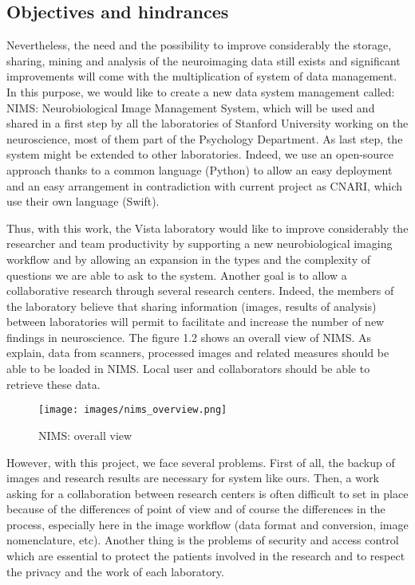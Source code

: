 \subsection{Objectives and hindrances}
\par
Nevertheless, the need and the possibility to improve considerably the storage, sharing, mining and analysis of the neuroimaging data still exists and significant improvements will come with the multiplication of system of data management. In this purpose, we would like to create a new data system management called: NIMS: Neurobiological Image Management System, which will be used and shared in a first step by all the laboratories of Stanford University working on the neuroscience, most of them part of the Psychology Department. As last step, the system might be extended to other laboratories. Indeed, we use an open-source approach thanks to a common language (Python) to allow an easy deployment and an easy arrangement in contradiction with  current project as CNARI, which use their own language (Swift).
\par
Thus, with this work, the Vista laboratory would like to improve considerably the researcher and team productivity by supporting a new neurobiological imaging workflow and by allowing an expansion in the types and the complexity of questions we are able to ask to the system. Another goal is to allow a collaborative research through several research centers. Indeed, the members of the laboratory believe that sharing information (images, results of analysis) between laboratories will permit to facilitate and increase the number of new findings in  neuroscience. The figure 1.2 shows an overall view of NIMS. As explain, data from scanners, processed images and related measures should be able to be loaded in NIMS. Local user and collaborators should be able to retrieve these data.
\begin{figure}[!h]
\begin{center}
\texttt{[image: images/nims\_overview.png]}
\caption{\small NIMS: overall view}
\end{center}
\end{figure}
\par
However, with this project, we face several problems. First of all, the backup of images and research results are necessary for system like ours. Then, a work asking for a collaboration between research centers is often difficult to set in place because of the differences of point of view and of course the differences in the process, especially here in the image workflow (data format and conversion, image nomenclature, etc). Another thing is the problems of security and access control which are essential to protect the patients involved in the research and to respect the privacy and the work of each laboratory.
